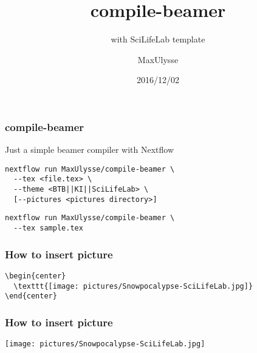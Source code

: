 \documentclass{beamer}
\title{compile-beamer}
\subtitle{with SciLifeLab template}
\author{MaxUlysse}
\institute{Barntumörbanken / SciLifeLab}
\date{2016/12/02}
\begin{document}
\begin{frame}
	\titlepage
\end{frame}

\begin{frame}[fragile]
	\frametitle{compile-beamer}
	Just a simple beamer compiler with Nextflow
	\begin{verbatim}
nextflow run MaxUlysse/compile-beamer \
  --tex <file.tex> \
  --theme <BTB||KI||SciLifeLab> \
  [--pictures <pictures directory>]
	\end{verbatim}
	\begin{verbatim}
nextflow run MaxUlysse/compile-beamer \
  --tex sample.tex
	\end{verbatim}
\end{frame}

\begin{frame}[fragile]
	\frametitle{How to insert picture}
	\begin{verbatim}
\begin{center}
  \texttt{[image: pictures/Snowpocalypse-SciLifeLab.jpg]}
\end{center}
	\end{verbatim}
\end{frame}

\begin{frame}
	\frametitle{How to insert picture}
	\begin{center}
		\texttt{[image: pictures/Snowpocalypse-SciLifeLab.jpg]}
	\end{center}
\end{frame}
\end{document}
